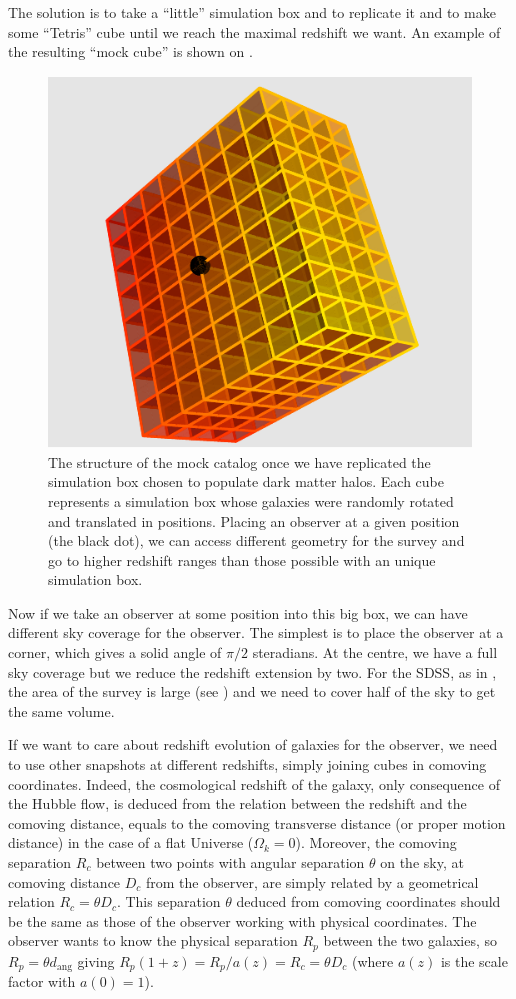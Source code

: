 The solution is to take a ``little'' simulation box and to replicate it and to
make some ``Tetris'' cube until we reach the maximal redshift we want. An
example of the resulting ``mock cube'' is shown on .
%
\begin{figure}[htb]
    \centering
    \includegraphics[width=0.4\linewidth]{figures/mock/mock}
    \caption{The structure of the mock catalog once we have replicated the
        simulation box chosen to populate dark matter halos. Each cube
        represents a simulation box whose galaxies were randomly rotated and
        translated in positions. Placing an observer at a given position (the
    black dot), we can access different geometry for the survey and go to
higher redshift ranges than those possible with an unique simulation
box.\label{fig:cubemock}}%
\end{figure}

Now if we take an observer at some position into this big box, we can have
different sky coverage for the observer. The simplest is to place the observer
at a corner, which gives a solid angle of $\pi/2$ steradians. At the centre,
we have a full sky coverage but we reduce the redshift extension by two. For
the SDSS, as in , the area of the survey is large (see
) and we need to cover half of the sky to get the same
volume.

If we want to care about redshift evolution of galaxies for the observer, we
need to use other snapshots at different redshifts, simply joining cubes in
comoving coordinates. Indeed, the cosmological redshift of the galaxy, only
consequence of the Hubble flow, is deduced from the relation between the
redshift and the comoving distance, equals to the comoving transverse distance
(or proper motion distance) in the case of a flat Universe ($\Omega_k=0$).
Moreover, the comoving separation $R_c$ between two points with angular
separation $\theta$ on the sky, at comoving distance $D_c$ from the observer,
are simply related by a geometrical relation $R_c=\theta D_c$. This separation
$\theta$ deduced from comoving coordinates should be the same as those of the
observer working with physical coordinates. The observer wants to know the
physical separation $R_p$ between the two galaxies, so $R_p=\theta
d_\mathrm{ang}$ giving $R_p \left(1+z\right)= R_p/a\left(z\right)=R_c=\theta
D_c$ (where $a \left(z\right)$ is the scale factor with $a \left(0\right)=1$).

